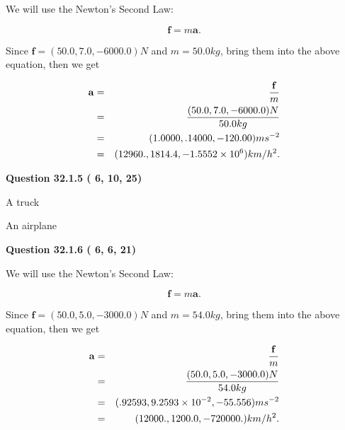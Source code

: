 \documentclass[12pt]{article}
\begin{document}
We will use the Newton's Second Law:
 
\[
\mathbf{f}=m\mathbf{a}.
\]
 
Since $\mathbf{f}=( %
50.0,  %
7.0,  %
-6000.0 )N$
and $m= %
50.0 kg$, bring them into the above equation, then we get
 
\begin{eqnarray*}
\mathbf{a}&=&\frac{\mathbf{f}}m  \\
&=&\frac{(
50.0 ,
7.0 ,
-6000.0 )N
}{ %
50.0 kg}  \\
&=&(
1.0000 ,
.14000,
-120.00
)ms^{-2} \\
&=&(
12960. ,
1814.4 ,
-1.5552 \times 10^{6}
)km/h^2.
\end{eqnarray*}
 
 
 
  
\vspace{0.2in}
  
{\textbf{\Large{Question
32.1.5 
 (          6,         10,         25)
}}}
  
  
 
 
\noindent{}
 
 
A truck
 
 
An airplane
 
 
 
 
  
\vspace{0.2in}
  
{\textbf{\Large{Question
32.1.6 
 (          6,          6,         21)
}}}
  
  
 
 
\noindent{}

We will use the Newton's Second Law:
 
\[
\mathbf{f}=m\mathbf{a}.
\]
 
Since $\mathbf{f}=( %
50.0,  %
5.0,  %
-3000.0 )N$
and $m= %
54.0 kg$, bring them into the above equation, then we get
 
\begin{eqnarray*}
\mathbf{a}&=&\frac{\mathbf{f}}m  \\
&=&\frac{(
50.0 ,
5.0 ,
-3000.0 )N
}{ %
54.0 kg}  \\
&=&(
.92593 ,
9.2593 \times 10^{-2},
-55.556
)ms^{-2} \\
&=&(
12000. ,
1200.0 ,
-720000.
)km/h^2.
\end{eqnarray*}
 
\end{document}
